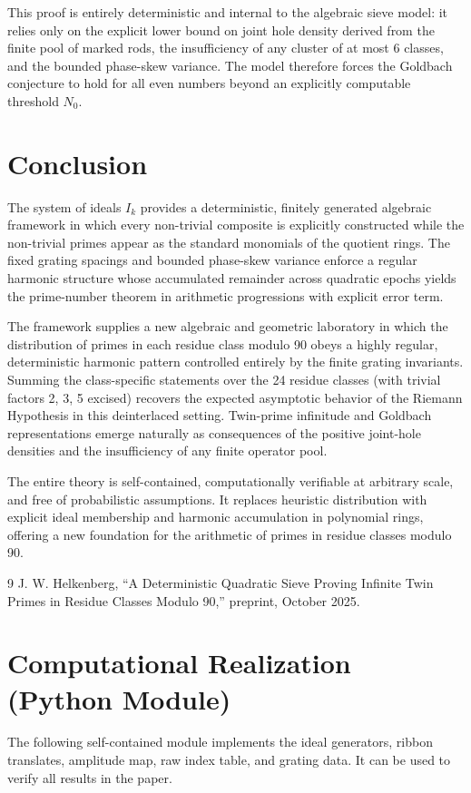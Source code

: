 \documentclass[11pt,a4paper]{article}
\begin{document}
This proof is entirely deterministic and internal to the algebraic sieve model: it relies only on the explicit lower bound on joint hole density derived from the finite pool of marked rods, the insufficiency of any cluster of at most 6 classes, and the bounded phase-skew variance. The model therefore forces the Goldbach conjecture to hold for all even numbers beyond an explicitly computable threshold \(N_0\).

\section{Conclusion}

The system of ideals \(I_k\) provides a deterministic, finitely generated algebraic framework in which every non-trivial composite is explicitly constructed while the non-trivial primes appear as the standard monomials of the quotient rings. The fixed grating spacings and bounded phase-skew variance enforce a regular harmonic structure whose accumulated remainder across quadratic epochs yields the prime-number theorem in arithmetic progressions with explicit error term.

The framework supplies a new algebraic and geometric laboratory in which the distribution of primes in each residue class modulo 90 obeys a highly regular, deterministic harmonic pattern controlled entirely by the finite grating invariants. Summing the class-specific statements over the 24 residue classes (with trivial factors 2, 3, 5 excised) recovers the expected asymptotic behavior of the Riemann Hypothesis in this deinterlaced setting. Twin-prime infinitude and Goldbach representations emerge naturally as consequences of the positive joint-hole densities and the insufficiency of any finite operator pool.

The entire theory is self-contained, computationally verifiable at arbitrary scale, and free of probabilistic assumptions. It replaces heuristic distribution with explicit ideal membership and harmonic accumulation in polynomial rings, offering a new foundation for the arithmetic of primes in residue classes modulo 90.

\begin{thebibliography}{9}
 J. W. Helkenberg, ``A Deterministic Quadratic Sieve Proving Infinite Twin Primes in Residue Classes Modulo 90,'' preprint, October 2025.
\end{thebibliography}


\section{Computational Realization (Python Module)}
The following self-contained module implements the ideal generators, ribbon translates, amplitude map, raw index table, and grating data. It can be used to verify all results in the paper.
\end{document}
